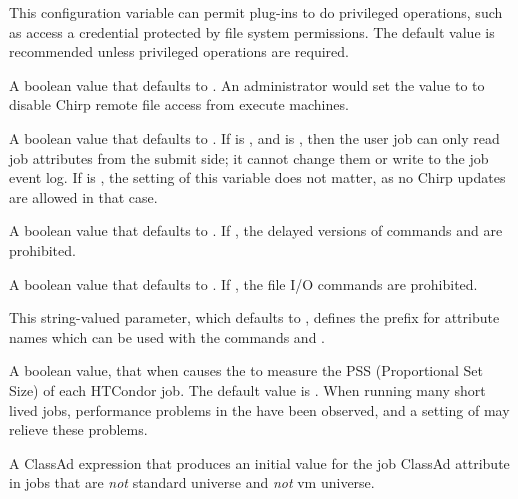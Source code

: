 \begin{description}
  This configuration variable can permit plug-ins to do privileged operations,
  such as access a credential protected by file system permissions.
  The default value is recommended unless privileged operations are 
  required.

\label{param:EnableChirp} 
\item[\Macro{ENABLE\_CHIRP}]
  A boolean value that defaults to . An administrator
  would set the value to  to disable Chirp remote file access 
  from execute machines. 

\label{param:EnableChirpUpdates}
\item[\Macro{ENABLE\_CHIRP\_UPDATES}]
  A boolean value that defaults to .  If 
  is , and  is ,
  then the user job can only read job attributes from the submit side;
  it cannot change them or write to the job event log.
  If  is ,
  the setting of this variable does not matter, 
  as no Chirp updates are allowed in that case.

\label{param:EnableChirpDelayed}
\item[\Macro{ENABLE\_CHIRP\_DELAYED}]
  A boolean value that defaults to . 
  If , the delayed versions of  commands
   and  are prohibited.

\label{param:EnableChirpIO}
\item[\Macro{ENABLE\_CHIRP\_IO}]
  A boolean value that defaults to .  If ,
  the file I/O  commands are prohibited.

\label{param:RemoteUpdatePrefix}
\item[\Macro{REMOTE\_UPDATE\_PREFIX}]
  This string-valued parameter, which defaults to ,
  defines the prefix for attribute names which can be used with the
   commands  and 
  .

\label{param:UsePSS} 
\item[\Macro{USE\_PSS}]
  A boolean value, that when  causes the  to
  measure the PSS (Proportional Set Size) of each HTCondor job.
  The default value is .
  When running many short lived jobs, performance problems in 
  the  have been observed, and a setting of 
  may relieve these problems.

\label{param:MemoryUsageMetric} 
\item[\Macro{MEMORY\_USAGE\_METRIC}]
  A ClassAd expression that produces an initial value for the job ClassAd
  attribute  in jobs that are \emph{not} standard 
  universe and \emph{not} vm universe.


\end{description}
